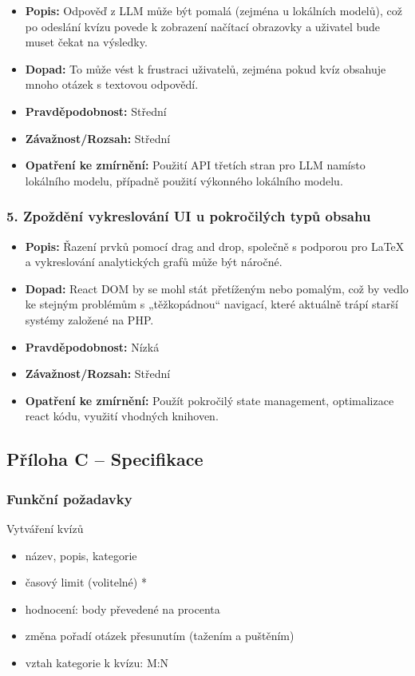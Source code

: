 \documentclass{vskpou} %
\begin{document}
\begin{itemize}
    \item \textbf{Popis:} Odpověď z LLM může být pomalá (zejména u lokálních modelů), což po odeslání kvízu povede k zobrazení načítací obrazovky a uživatel bude muset čekat na výsledky.
    \item \textbf{Dopad:} To může vést k frustraci uživatelů, zejména pokud kvíz obsahuje mnoho otázek s textovou odpovědí.
    \item \textbf{Pravděpodobnost:} Střední
    \item \textbf{Závažnost/Rozsah:} Střední
    \item \textbf{Opatření ke zmírnění:} Použití API třetích stran pro LLM namísto lokálního modelu, případně použití výkonného lokálního modelu.
\end{itemize}

\subsubsection*{5. Zpoždění vykreslování UI u pokročilých typů obsahu}

\begin{itemize}
    \item \textbf{Popis:} Řazení prvků pomocí drag and drop, společně s podporou pro LaTeX a vykreslování analytických grafů může být náročné.
    \item \textbf{Dopad:} React DOM by se mohl stát přetíženým nebo pomalým, což by vedlo ke stejným problémům s „těžkopádnou“ navigací, které aktuálně trápí starší systémy založené na PHP.
    \item \textbf{Pravděpodobnost:} Nízká
    \item \textbf{Závažnost/Rozsah:} Střední
    \item \textbf{Opatření ke zmírnění:} Použít pokročilý state management, optimalizace react kódu, využití vhodných knihoven.
\end{itemize}

\clearpage
\subsection{Příloha C -- Specifikace}

\subsubsection*{Funkční požadavky}

Vytváření kvízů
\begin{itemize}
    \item název, popis, kategorie
    \item časový limit (volitelné) *
    \item hodnocení: body převedené na procenta
    \item změna pořadí otázek přesunutím (tažením a puštěním)
    \item vztah kategorie k kvízu: M:N
\end{itemize}
\end{document}
